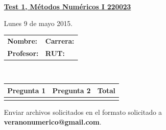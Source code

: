 \documentclass[11pt]{article}
\begin{document}
\hspace*{-1,5cm}

\vspace*{0.5cm} \centerline {\bf\underline{Test 1, M\'etodos Num\'ericos I 220023 }}
\centerline{\textrm{Lunes 9 de mayo 2015.}}  \vspace{0.2cm}


\begin{center}
 \begin{tabular}{p{}p{}}
	\textbf{Nombre:}   &\textbf{Carrera:}\\
	\textbf{Profesor:} & \textbf{ RUT:}
 \end{tabular}
 \\
 \vspace{0.2cm}
 \begin{tabular}{||p{2cm}|p{2cm}||p{2cm}||}
 \hline
 Pregunta 1 &  Pregunta 2  &     Total\\
 \hline
 \vspace{1.5cm} & &     \\
 \hline
 \end{tabular}
 \end{center}
 Enviar archivos solicitados en el formato solicitado a \textbf{veranonumerico@gmail.com}.
\end{document}
